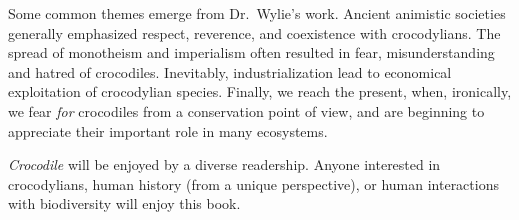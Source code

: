\documentclass[letterpaper,12pt]{article}
\newcommand{\croc}{\emph{Crocodile}\xspace}
\begin{document}
Some common themes emerge from Dr.\ Wylie's work.
Ancient animistic societies generally emphasized respect, reverence, and
coexistence with crocodylians.
The spread of monotheism and imperialism often resulted in fear,
misunderstanding and hatred of crocodiles.
Inevitably, industrialization lead to economical exploitation of crocodylian
species.
Finally, we reach the present, when, ironically, we fear \emph{for} crocodiles
from a conservation point of view, and are beginning to appreciate their
important role in many ecosystems.

\croc will be enjoyed by a diverse readership. Anyone interested in
crocodylians, human history (from a unique perspective), or human interactions
with biodiversity will enjoy this book.




\end{document}
